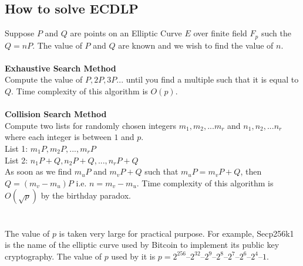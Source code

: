 \documentclass[a4paper,12pt]{report}
\begin{document}
\subsection{How to solve ECDLP}
Suppose  $P$ and $Q$ are points on an Elliptic Curve $E$ over finite field $F_p$ such the $Q=nP$. The value of $P$ and $Q$ are known and we wish to find the value of $n$.\\\\
\textbf{Exhaustive Search Method}\\
Compute the value of $P,2P,3P...$ until you find a multiple such that it is equal to $Q$. Time complexity of this algorithm is $O(p)$.\\\\
\textbf{Collision Search Method}\\
Compute two lists for randomly chosen integers $m_1, m_2, . . .m_r$ and $n_1, n_2, . . .n_r$ where each integer is between $1$ and $p$.\\
List 1: $m_1 P, m_2 P, . . .,m_r P$\\
List 2: $n_1 P + Q, n_2 P + Q, . . ., n_r P + Q$\\
As soon as we find $m_u P$ and $m_v P + Q$ such that $m_u P = m_v P + Q$, then $Q = (m_v - m_u) P $ i.e. $n=m_v - m_u$. Time complexity of this algorithm is $O(\sqrt{p})$ by the birthday paradox.\\\\\\
The value of $p$ is taken very large for practical purpose. For example, Secp256k1 is the name of the elliptic curve used by Bitcoin to implement its public key cryptography. The value of $p$ used by it is $p = 2^{256} – 2^{32} – 2^9 – 2^8 – 2^7 – 2^6 – 2^4 – 1$.
\cleardoublepage
\end{document}

